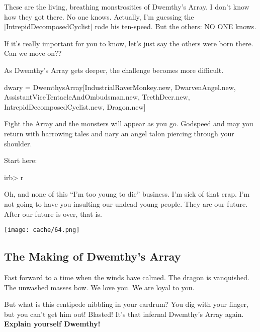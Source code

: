 \documentclass[12pt,twoside]{report}
\begin{document}
These are the living, breathing monstrosities of Dwemthy's Array.  I
don't know how they got there.  No one knows.  Actually, I'm guessing
the \rubyinline|IntrepidDecomposedCyclist| rode his
ten-speed.  But the others: NO ONE knows.

If it's really important for you to know, let's just say the others
were born there. Can we move on??

As Dwemthy's Array gets deeper, the challenge becomes more difficult.


\begin{rubycode}

 dwary = DwemthysArray[IndustrialRaverMonkey.new,
                       DwarvenAngel.new,
                       AssistantViceTentacleAndOmbudsman.new,
                       TeethDeer.new,
                       IntrepidDecomposedCyclist.new,
                       Dragon.new]

\end{rubycode}


Fight the Array and the monsters will appear as you go.  Godspeed and
may you return with harrowing tales and nary an angel talon piercing
through your shoulder.

Start here:


\begin{consolecode}

 irb> r %

\end{consolecode}


Oh, and none of this ``I'm too young to die'' business.  I'm sick of
that crap. I'm not going to have you insulting our undead young
people.  They are our future. After our future is over, that is.

	\texttt{[image: cache/64.png]}



\subsection{The Making of Dwemthy's Array}



Fast forward to a time when the winds have calmed.  The dragon is
vanquished.  The unwashed masses bow.  We love you. We are loyal to
you.

But what is this centipede nibbling in your eardrum?  You dig with
your finger, but you can't get him out!  Blasted!  It's that infernal
Dwemthy's Array again.  {\bf Explain yourself Dwemthy!}
\end{document}
